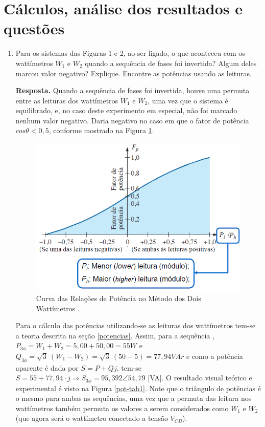 \documentclass[a4paper,12pt,oneside,openany,table,xcdraw]{article}
\begin{document}
\section{Cálculos, análise dos resultados e questões} %
\begin{enumerate}[1)]
\item Para os sistemas das Figuras 1 e 2, ao ser ligado, o que aconteceu com os wattímetros $W_1$ e $W_2$ quando a sequência de fases foi invertida? Algum deles marcou valor negativo? Explique. Encontre as potências usando as leituras. 

\vspace{0.8mm}
\textbf{Resposta.} Quando  a sequência de fases foi invertida, houve uma permuta entre as leituras dos wattímetros $W_1$ e $W_2$, uma vez que o sistema é equilibrado, e, no caso deste experimento em especial, não foi marcado nenhum valor negativo. Daria negativo no caso em que o fator de potência $cos \theta <0,5$, conforme mostrado na Figura \ref{fp}.
\begin{figure}[H]
\centering
\captionsetup{font=scriptsize}
\includegraphics[width=13cm]{fp}
\caption{Curva das Relações de Potência no Método dos Dois Wattímetros \cite{ph}.}
\label{fp}
\end{figure}

Para o cálculo das potências utilizando-se as leituras dos wattímetros tem-se a teoria descrita na seção \ref{potencias}. Assim, para a sequência , $P_{3\phi}=W_1+W_2 = 5,00 + 50,00 = 55 W$ e $Q_{3\phi} = \sqrt{3}\ (W_1 - W_2) = \sqrt{3}\ (50 - 5) = 77,94 VAr$ e como a potência aparente é dada por $S=P+Qj$, tem-se $S= 55 + 77,94\cdot j \Rightarrow S_{3\phi} = 95,392\angle 54,79$ [VA]. O resultado visual teórico e experimental é visto na Figura \ref{pot-tab1}. Note que o triângulo de potências é o mesmo para ambas as sequências, uma vez que a permuta das leitura nos wattímetros também permuta os valores a serem considerados como $W_1$ e $W_2$ (que agora será o wattímetro conectado a tensão $V_{CB}$). %


\end{enumerate}
\end{document}
